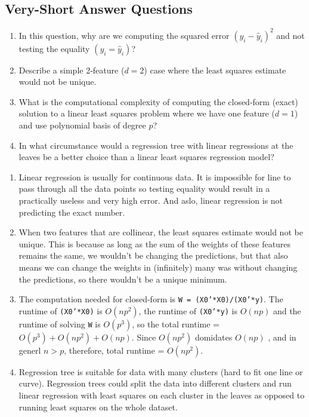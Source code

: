 \documentclass{article}
\def\blu#1{{\color{blu}#1}}
\def\enum#1{\begin{enumerate}#1\end{enumerate}}
\begin{document}
\subsection{Very-Short Answer Questions}

\blu{
\enum{
\item In this question, why are we computing the squared error $(y_i -  \hat{y}_i)^2$ and not testing the equality $(y_i = \hat{y}_i)$?
\item Describe a simple 2-feature ($d=2$) case where the least squares estimate would not be unique.
\item What is the computational complexity of computing the closed-form (exact) solution to a linear least squares problem where we have one feature ($d = 1$) and use polynomial basis of degree $p$?
\item  In what circumstance would a regression tree with linear regressions at the leaves be a better choice than a linear least squares regression model?
}}

\begin{enumerate}
\item Linear regression is usually for continuous data. It is impossible for line to pass through all the data points so testing equality would result in a practically useless and very high error. And aslo, linear regression is not predicting the exact number.
\item 
When two features that are collinear, the least squares estimate would not be unique. This is because as long as the sum of the weights of these features remains the same, we wouldn't be changing the predictions, but that also means we can change the weights in (infinitely) many was without changing the predictions, so there wouldn't be a unique minimum.

\item 
The computation needed for closed-form is \texttt{W = (X0'*X0)/(X0'*y)}. 
The runtime of  \texttt{(X0'*X0)} is $O(np^2)$, the runtime of \texttt{(X0'*y)} is $O(np)$ and  
the runtime of solving \texttt{W} is $O(p^3)$, so the total runtime  = $O(p^3) +O(np^2) + O(np)$.
Since $O(np^2)$ domidates $O(np)$ , and in generl $n>p$, therefore, total runtime = $O(np^2)$.


\item
Regression tree is suitable for data with many clusters (hard to fit one line or curve). Regression trees could split the data into different clusters and run linear regression with least squares on each cluster in the leaves as opposed to running least squares on the whole dataset.

\end{enumerate}
\end{document}
